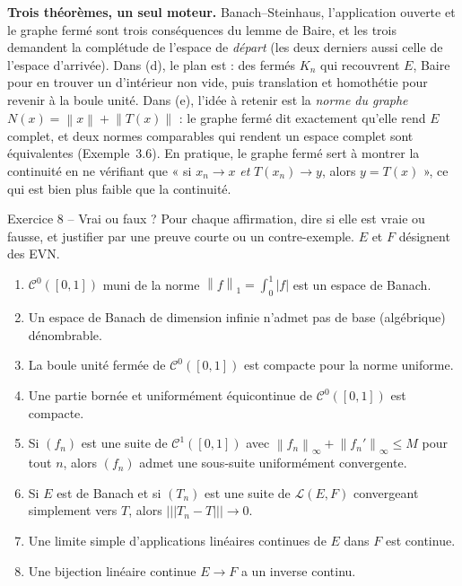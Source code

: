 \documentclass[11pt,a4paper]{article}
\newcommand{\norm}[1]{\left\|#1\right\|}
\newcommand{\opnorm}[1]{|\!|\!|#1|\!|\!|}
\newcommand{\Lc}{\mathcal{L}}
\newcommand{\Cz}{\mathcal{C}^0}
\theoremstyle{definition}
\begin{document}
\begin{methode}
\textbf{Trois théorèmes, un seul moteur.} Banach--Steinhaus, l'application ouverte et le graphe fermé sont trois conséquences du lemme de Baire, et les trois demandent la complétude de l'espace de \emph{départ} (les deux derniers aussi celle de l'espace d'arrivée). Dans (d), le plan est : des fermés $K_n$ qui recouvrent $E$, Baire pour en trouver un d'intérieur non vide, puis translation et homothétie pour revenir à la boule unité. Dans (e), l'idée à retenir est la \emph{norme du graphe} $N(x)=\norm x+\norm{T(x)}$ : le graphe fermé dit exactement qu'elle rend $E$ complet, et deux normes comparables qui rendent un espace complet sont équivalentes (Exemple~3.6). En pratique, le graphe fermé sert à montrer la continuité en ne vérifiant que « si $x_n\to x$ \emph{et} $T(x_n)\to y$, alors $y=T(x)$ », ce qui est bien plus faible que la continuité.
\end{methode}

\begin{exo}{Exercice 8 -- Vrai ou faux ?}
Pour chaque affirmation, dire si elle est vraie ou fausse, et justifier par une preuve courte ou un contre-exemple. $E$ et $F$ désignent des EVN.
\begin{enumerate}[label=\arabic*.]
  \item $\Cz([0,1])$ muni de la norme $\norm f_1=\int_0^1|f|$ est un espace de Banach.
  \item Un espace de Banach de dimension infinie n'admet pas de base (algébrique) dénombrable.
  \item La boule unité fermée de $\Cz([0,1])$ est compacte pour la norme uniforme.
  \item Une partie bornée et uniformément équicontinue de $\Cz([0,1])$ est compacte.
  \item Si $(f_n)$ est une suite de $\mathcal C^1([0,1])$ avec $\norm{f_n}_\infty+\norm{f_n'}_\infty\le M$ pour tout $n$, alors $(f_n)$ admet une sous-suite uniformément convergente.
  \item Si $E$ est de Banach et si $(T_n)$ est une suite de $\Lc(E,F)$ convergeant simplement vers $T$, alors $\opnorm{T_n-T}\to0$.
  \item Une limite simple d'applications linéaires continues de $E$ dans $F$ est continue.
  \item Une bijection linéaire continue $E\to F$ a un inverse continu.
\end{enumerate}
\end{exo}
\end{document}
